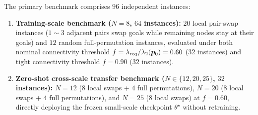 The primary benchmark comprises $96$ independent instances:
\begin{enumerate}
 \item \textbf{Training-scale benchmark ($N=8$, $64$ instances):} $20$ local pair-swap instances ($1\sim 3$ adjacent pairs swap goals while remaining nodes stay at their goals) and $12$ random full-permutation instances, evaluated under both nominal connectivity threshold $f=\lambda_{\mathrm{req}}/\lambda_2(\boldsymbol{p}_0)=0.60$ ($32$ instances) and tight connectivity threshold $f=0.90$ ($32$ instances).
 \item \textbf{Zero-shot cross-scale transfer benchmark ($N\in\{12,20,25\}$, $32$ instances):} $N=12$ ($8$ local swaps + $4$ full permutations), $N=20$ ($8$ local swaps + $4$ full permutations), and $N=25$ ($8$ local swaps) at $f=0.60$, directly deploying the frozen small-scale checkpoint $\theta^\star$ without retraining.
\end{enumerate}

